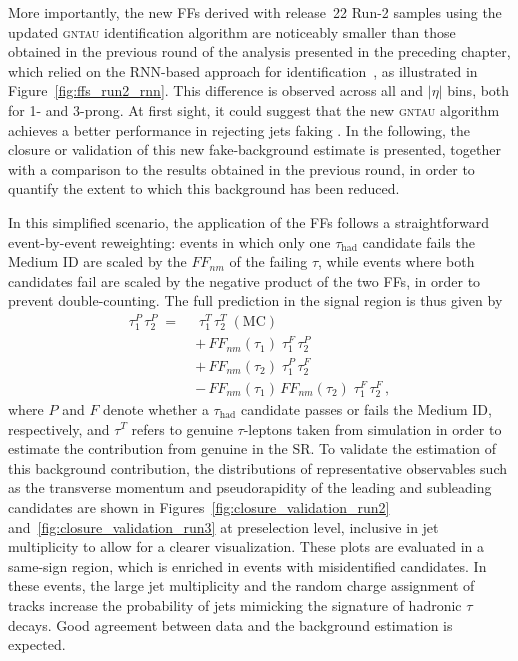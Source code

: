 More importantly, the new FFs derived with release~22 Run-2 samples using the updated \textsc{gntau} identification algorithm are noticeably smaller than those obtained in the previous round of the analysis presented in the preceding chapter, which relied on the RNN-based approach for \tauhad identification~\cite{serhat_tesis}, as illustrated in Figure~\ref{fig:ffs_run2_rnn}.  
This difference is observed across all \pt and $|\eta|$ bins, both for 1- and 3-prong. At first sight, it could suggest that the new \textsc{gntau} algorithm achieves a better performance in rejecting jets faking \tauhad. In the following, the closure or validation of this new fake-\tauhad background estimate is presented, together with a comparison to the results obtained in the previous round, in order to quantify the extent to which this background has been reduced.

In this simplified scenario, the application of the FFs follows a straightforward event-by-event reweighting: events in which only one $\tau_{\mathrm{had}}$ candidate fails the Medium ID are scaled by the $FF_{nm}$ of the failing $\tau$, while events where both candidates fail are scaled by the negative product of the two FFs, in order to prevent double-counting. The full prediction in the signal region is thus given by
\begin{align}
    \tau_1^{P}\,\tau_2^{P} \;=\;&\;
    \tau_1^{T}\,\tau_2^{T}\;(\text{MC}) \nonumber \\[0.2cm]
    &+\, FF_{nm}(\tau_1)\;\tau_1^{F}\,\tau_2^{P} \nonumber \\[0.2cm]
    &+\, FF_{nm}(\tau_2)\;\tau_1^{P}\,\tau_2^{F} \nonumber \\[0.2cm]
    &-\, FF_{nm}(\tau_1)\,FF_{nm}(\tau_2)\;\tau_1^{F}\,\tau_2^{F}\,,
    \label{eq_fakes}
    \end{align}
where $P$ and $F$ denote whether a $\tau_{\mathrm{had}}$ candidate passes or fails the Medium ID, respectively, and $\tau^T$ refers to genuine $\tau$-leptons taken from simulation in order to estimate the contribution from genuine \tauhad in the SR.  
To validate the estimation of this background contribution, the distributions of representative observables such as the transverse momentum and pseudorapidity of the leading and subleading \tauhad candidates are shown in Figures~\ref{fig:closure_validation_run2} and~\ref{fig:closure_validation_run3} at preselection level, inclusive in jet multiplicity to allow for a clearer visualization.  
These plots are evaluated in a same-sign region, which is enriched in events with misidentified \tauhad candidates. In these events, the large jet multiplicity and the random charge assignment of tracks increase the probability of jets mimicking the signature of hadronic $\tau$ decays. Good agreement between data and the background estimation is expected. 
    
